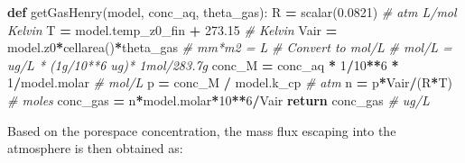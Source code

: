 \documentclass[]{article}
\newenvironment{Shaded}{\begin{snugshade}}{\end{snugshade}}
\newcommand{\KeywordTok}[1]{\textcolor[rgb]{0.13,0.29,0.53}{\textbf{{#1}}}}
\newcommand{\DecValTok}[1]{\textcolor[rgb]{0.00,0.00,0.81}{{#1}}}
\newcommand{\FloatTok}[1]{\textcolor[rgb]{0.00,0.00,0.81}{{#1}}}
\newcommand{\CommentTok}[1]{\textcolor[rgb]{0.56,0.35,0.01}{\textit{{#1}}}}
\newcommand{\ControlFlowTok}[1]{\textcolor[rgb]{0.13,0.29,0.53}{\textbf{{#1}}}}
\newcommand{\OperatorTok}[1]{\textcolor[rgb]{0.81,0.36,0.00}{\textbf{{#1}}}}
\newcommand{\NormalTok}[1]{{#1}}
\begin{document}
\begin{Shaded}
\begin{Highlighting}[]

\KeywordTok{def} \NormalTok{getGasHenry(model, conc_aq, theta_gas):}
    \NormalTok{R }\OperatorTok{=} \NormalTok{scalar(}\FloatTok{0.0821}\NormalTok{)  }\CommentTok{# atm L/mol Kelvin}
    \NormalTok{T }\OperatorTok{=} \NormalTok{model.temp_z0_fin }\OperatorTok{+} \FloatTok{273.15}  \CommentTok{# Kelvin}
    \NormalTok{Vair }\OperatorTok{=} \NormalTok{model.z0}\OperatorTok{*}\NormalTok{cellarea()}\OperatorTok{*}\NormalTok{theta_gas  }\CommentTok{# mm*m2 = L}
    \CommentTok{# Convert to mol/L}
    \CommentTok{# mol/L = ug/L * (1g/10**6 ug)* 1mol/283.7g}
    \NormalTok{conc_M }\OperatorTok{=} \NormalTok{conc_aq }\OperatorTok{*} \DecValTok{1}\OperatorTok{/}\DecValTok{10}\OperatorTok{**}\DecValTok{6} \OperatorTok{*} \DecValTok{1}\OperatorTok{/}\NormalTok{model.molar  }\CommentTok{# mol/L}
    \NormalTok{p }\OperatorTok{=} \NormalTok{conc_M }\OperatorTok{/} \NormalTok{model.k_cp  }\CommentTok{# atm}
    \NormalTok{n }\OperatorTok{=} \NormalTok{p}\OperatorTok{*}\NormalTok{Vair}\OperatorTok{/}\NormalTok{(R}\OperatorTok{*}\NormalTok{T)  }\CommentTok{# moles}
    \NormalTok{conc_gas }\OperatorTok{=} \NormalTok{n}\OperatorTok{*}\NormalTok{model.molar}\OperatorTok{*}\DecValTok{10}\OperatorTok{**}\DecValTok{6}\OperatorTok{/}\NormalTok{Vair}
    \ControlFlowTok{return} \NormalTok{conc_gas  }\CommentTok{# ug/L}
    
\end{Highlighting}
\end{Shaded}

Based on the porespace concentration, the mass flux escaping into the
atmosphere is then obtained as:
\end{document}
